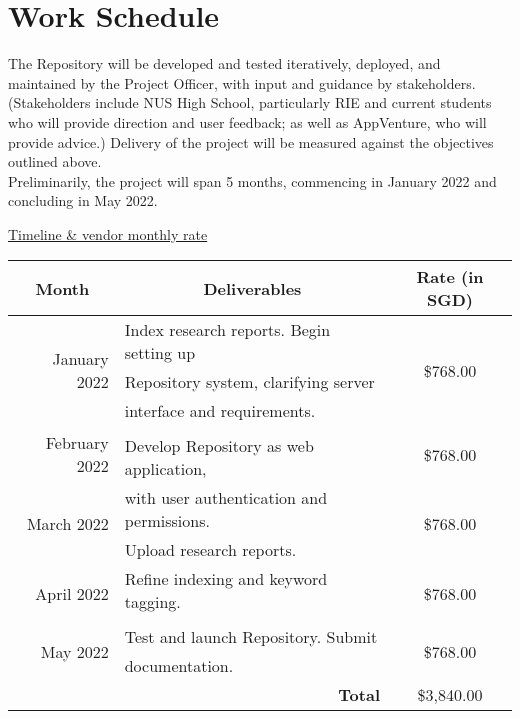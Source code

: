 \documentclass{article}
\begin{document}
\section{Work Schedule}

The Repository will be developed and tested iteratively, deployed, and maintained by the Project Officer, with input and guidance by stakeholders. (Stakeholders include NUS High School, particularly RIE and current students who will provide direction and user feedback; as well as AppVenture, who will provide advice.) Delivery of the project will be measured against the objectives outlined above. \\

Preliminarily, the project will span 5 months, commencing in January 2022 and concluding in May 2022. \\

\begin{center}
\underline{Timeline \& vendor monthly rate}
\end{center}

\centering
\begin{tabular}{|rl|c|}
\hline
\multicolumn{1}{|c|}{\textbf{Month}}                 & \multicolumn{1}{c|}{\textbf{Deliverables}} & \textbf{Rate (in SGD)}    \\ \hline
\multicolumn{1}{|r|}{\multirow{3}{*}{January 2022}}  & Index research reports. Begin setting up   & \multirow{3}{*}{\$768.00} \\
\multicolumn{1}{|r|}{} & Repository system, clarifying server   &            \\
\multicolumn{1}{|r|}{} & interface and requirements.            &            \\ \hline
\multicolumn{1}{|r|}{\multirow{2}{*}{February 2022}} &                                            & \multirow{2}{*}{\$768.00} \\
\multicolumn{1}{|r|}{} & Develop Repository as web application, &            \\ \cline{1-1} \cline{3-3} 
\multicolumn{1}{|r|}{\multirow{2}{*}{March 2022}}    & with user authentication and permissions.  & \multirow{2}{*}{\$768.00} \\
\multicolumn{1}{|r|}{} & Upload research reports.               &            \\ \cline{1-1} \cline{3-3} 
\multicolumn{1}{|r|}{\multirow{2}{*}{April 2022}}    & Refine indexing and keyword tagging.       & \multirow{2}{*}{\$768.00} \\
\multicolumn{1}{|r|}{} &                                        &            \\ \hline
\multicolumn{1}{|r|}{\multirow{2}{*}{May 2022}}      & Test and launch Repository. Submit         & \multirow{2}{*}{\$768.00} \\
\multicolumn{1}{|r|}{} & documentation.                         &            \\ \hline
\multicolumn{2}{|r|}{\textbf{Total}}                            & \$3,840.00 \\ \hline
\end{tabular}


\printbibliography[title={References}]
\end{document}

